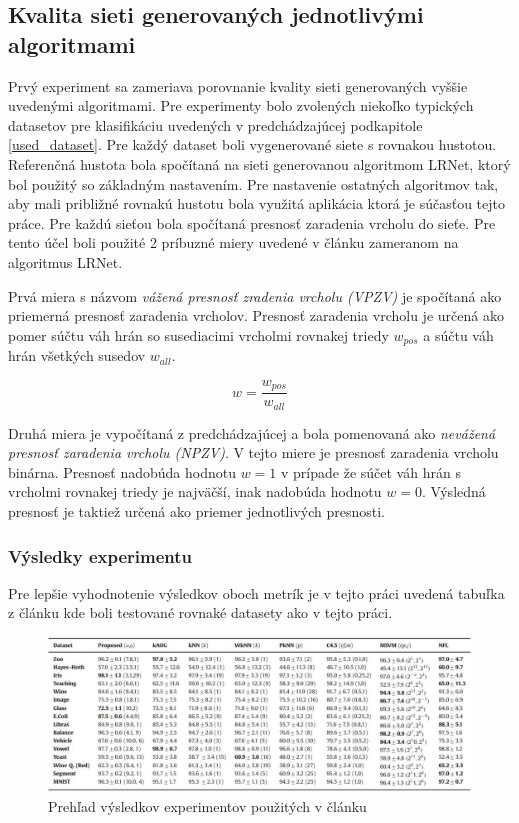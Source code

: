 \documentclass[slovak,master,dept460,male,cpp,cpdeclaration]{diploma}
\begin{document}
\subsection{Kvalita sieti generovaných jednotlivými
algoritmami}\label{datasets_metrics}

Prvý experiment sa zameriava porovnanie kvality sieti generovaných vyššie uvedenými algoritmami. Pre experimenty bolo zvolených niekoľko typických datasetov pre klasifikáciu uvedených v predchádzajúcej podkapitole \ref{used_dataset}. Pre každý dataset boli vygenerované siete s rovnakou hustotou. Referenčná hustota bola spočítaná na sieti generovanou algoritmom LRNet, ktorý bol použitý so základným nastavením. Pre nastavenie ostatných algoritmov tak, aby mali približné rovnakú hustotu bola využitá aplikácia ktorá je súčasťou tejto práce. Pre každú sieťou bola spočítaná presnosť zaradenia vrcholu do sieťe. Pre tento účel boli použité 2 príbuzné miery uvedené v článku zameranom na algoritmus LRNet. \cite{lrntet}

Prvá miera s názvom \textit{ vážená presnosť zradenia vrcholu (VPZV)} je spočítaná ako priemerná presnosť zaradenia  vrcholov. Presnosť zaradenia vrcholu je určená ako pomer súčtu váh hrán so susediacimi vrcholmi rovnakej triedy $w_{pos}$ a súčtu váh hrán všetkých susedov $w_{all}$. 

\begin{equation}
    w = \frac{w_{pos}}{w_{all}}
\end{equation}

Druhá miera je vypočítaná z predchádzajúcej a bola pomenovaná ako \textit{ nevážená presnosť zaradenia vrcholu (NPZV)}. V tejto miere je presnosť zaradenia vrcholu binárna. Presnosť nadobúda hodnotu $w=1$ v prípade že súčet váh hrán s vrcholmi rovnakej triedy je najväčší, inak nadobúda hodnotu $w=0$. Výsledná presnosť je taktiež určená ako priemer jednotlivých presnosti.

\subsubsection{Výsledky experimentu}

Pre lepšie vyhodnotenie výsledkov oboch metrík je v tejto práci uvedená tabuľka z článku \cite{easeofaccess} kde boli testované rovnaké datasety ako v tejto práci.
\begin{figure}[H]
\centering
\includegraphics[width=\textwidth]{datasets_ease.JPG}
\caption{Prehľad výsledkov experimentov použitých v článku \cite{easeofaccess} }
\label{datasets_acc}
\end{figure} 
\end{document}
